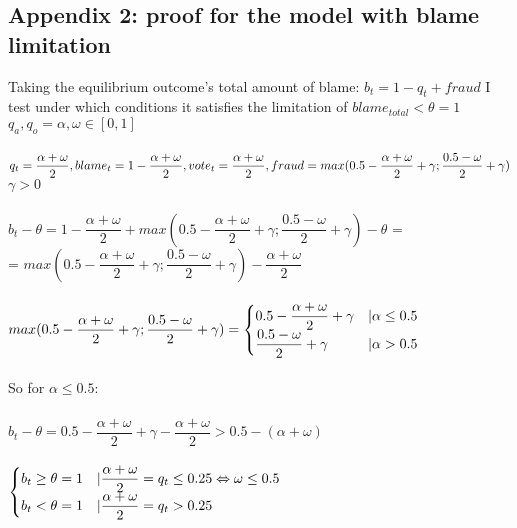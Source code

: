 \documentclass[a4paper, 12pt]{article}
\begin{document}
    \newpage
    \subsection*{\hypertarget{app2}{Appendix 2}: proof for the model with blame limitation}
    
    Taking the equilibrium outcome's total amount of blame: $b_{t} = 1 - q_t + fraud$ I test under which conditions it satisfies the limitation of $blame_{total} < \theta = 1$\\
    $q_a, q_o = \alpha, \omega \in [0,1]$\\\\
    $q_t = \dfrac{\alpha+\omega}{2}, blame_t = 1 - \dfrac{\alpha+\omega}{2}, vote_t = \dfrac{\alpha+\omega}{2},\\ fraud = max(0.5 - \dfrac{\alpha+\omega}{2} + \gamma; \dfrac{0.5 - \omega}{2} +\gamma)$ \textbar $\gamma > 0$\\\\
    $b_t - \theta = 1 - \dfrac{\alpha+\omega}{2} + max(0.5 - \dfrac{\alpha+\omega}{2} + \gamma; \dfrac{0.5 - \omega}{2} +\gamma) - \theta$ = \\= $max(0.5 - \dfrac{\alpha+\omega}{2} + \gamma; \dfrac{0.5 - \omega}{2} +\gamma) - \dfrac{\alpha+\omega}{2}$\\\\
    $max(0.5 - \dfrac{\alpha+\omega}{2} + \gamma; \dfrac{0.5 - \omega}{2} +\gamma)= \begin{cases}
        0.5 - \dfrac{\alpha+\omega}{2} + \gamma & \textbar \alpha \leq 0.5 \\ 
        \dfrac{0.5 - \omega}{2} +\gamma & \textbar \alpha > 0.5
    \end{cases}$\\\\
    So for $\alpha \leq 0.5$:\\\\
    $b_t -\theta = 0.5 - \dfrac{\alpha+\omega}{2} + \gamma - \dfrac{\alpha+\omega}{2} > 0.5 - (\alpha + \omega)$\\\\
    $\begin{cases}
    b_t \geq \theta = 1 & \textbar  \dfrac{\alpha+\omega}{2} = q_t \leq 0.25 \Leftrightarrow \omega \leq 0.5\\
    b_t < \theta = 1 & \textbar  \dfrac{\alpha+\omega}{2} = q_t > 0.25
    \end{cases}$\\\\
\end{document}
